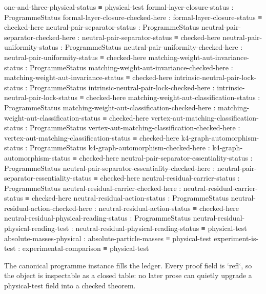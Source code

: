 \documentclass[11pt]{article}
\begin{document}
\begin{code}
      one-and-three-physical-status ≡ physical-test
    formal-layer-closure-status   : ProgrammeStatus
    formal-layer-closure-checked-here :
      formal-layer-closure-status ≡ checked-here
    neutral-pair-separator-status : ProgrammeStatus
    neutral-pair-separator-checked-here :
      neutral-pair-separator-status ≡ checked-here
    neutral-pair-uniformity-status : ProgrammeStatus
    neutral-pair-uniformity-checked-here :
      neutral-pair-uniformity-status ≡ checked-here
    matching-weight-aut-invariance-status : ProgrammeStatus
    matching-weight-aut-invariance-checked-here :
      matching-weight-aut-invariance-status ≡ checked-here
    intrinsic-neutral-pair-lock-status : ProgrammeStatus
    intrinsic-neutral-pair-lock-checked-here :
      intrinsic-neutral-pair-lock-status ≡ checked-here
    matching-weight-aut-classification-status : ProgrammeStatus
    matching-weight-aut-classification-checked-here :
      matching-weight-aut-classification-status ≡ checked-here
    vertex-aut-matching-classification-status : ProgrammeStatus
    vertex-aut-matching-classification-checked-here :
      vertex-aut-matching-classification-status ≡ checked-here
    k4-graph-automorphism-status : ProgrammeStatus
    k4-graph-automorphism-checked-here :
      k4-graph-automorphism-status ≡ checked-here
    neutral-pair-separator-essentiality-status : ProgrammeStatus
    neutral-pair-separator-essentiality-checked-here :
      neutral-pair-separator-essentiality-status ≡ checked-here
    neutral-residual-carrier-status : ProgrammeStatus
    neutral-residual-carrier-checked-here :
      neutral-residual-carrier-status ≡ checked-here
    neutral-residual-action-status : ProgrammeStatus
    neutral-residual-action-checked-here :
      neutral-residual-action-status ≡ checked-here
    neutral-residual-physical-reading-status : ProgrammeStatus
    neutral-residual-physical-reading-test :
      neutral-residual-physical-reading-status ≡ physical-test
    absolute-masses-physical     : absolute-particle-masses ≡ physical-test
    experiment-is-test           : experimental-comparison ≡ physical-test
\end{code}

  The canonical programme instance fills the ledger.  Every proof field is
  `refl`, so the object is inspectable as a closed table: no later prose can
  quietly upgrade a physical-test field into a checked theorem.
\end{document}
